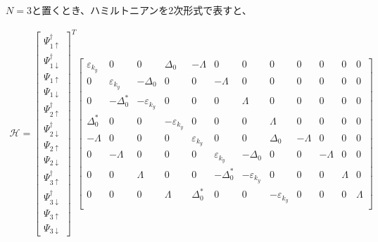 \documentclass{jsarticle}
\begin{document}
            $N=3$と置くとき、ハミルトニアンを2次形式で表すと、
            
            \begin{align}
                \mathcal{H}=
                \begin{bmatrix}
                    \Psi_{1\uparrow}^\dagger \\
                    \Psi_{1\downarrow}^\dagger \\
                    \Psi_{1\uparrow} \\
                    \Psi_{1\downarrow} \\
                    \Psi_{2\uparrow}^\dagger \\
                    \Psi_{2\downarrow}^\dagger \\
                    \Psi_{2\uparrow} \\
                    \Psi_{2\downarrow} \\
                    \Psi_{3\uparrow}^\dagger \\
                    \Psi_{3\downarrow}^\dagger \\
                    \Psi_{3\uparrow} \\
                    \Psi_{3\downarrow}
                \end{bmatrix}
                ^T
                \begin{bmatrix}
                    \varepsilon_{k_y} & 0 & 0 & \Delta_0 & -\varLambda & 0 & 0 & 0 & 0 & 0 & 0 & 0 \\
                    0 & \varepsilon_{k_y} & -\Delta_0 & 0 & 0 & -\varLambda & 0 & 0 & 0 & 0 & 0 & 0 \\
                    0 & -\Delta_0^\ast & -\varepsilon_{k_y} & 0 & 0 & 0 & \varLambda & 0 & 0 & 0 & 0 & 0 \\
                    \Delta_0^\ast & 0 & 0 & -\varepsilon_{k_y} & 0 & 0 & 0 & \varLambda & 0 & 0 & 0 & 0 \\
                    -\varLambda & 0 & 0 & 0 & \varepsilon_{k_y} & 0 & 0 & \Delta_0 & -\varLambda & 0 & 0 & 0 \\
                    0 & -\varLambda & 0 & 0 & 0 & \varepsilon_{k_y} & -\Delta_0 & 0 & 0 & -\varLambda & 0 & 0 \\
                    0 & 0 & \varLambda & 0 & 0 & -\Delta_0^\ast & -\varepsilon_{k_y} & 0 & 0 & 0 & \varLambda & 0 \\
                    0 & 0 & 0 & \varLambda & \Delta_0^\ast & 0 & 0 & -\varepsilon_{k_y} & 0 & 0 & 0 & \varLambda \\

\end{bmatrix}
\end{align}
\end{document}
